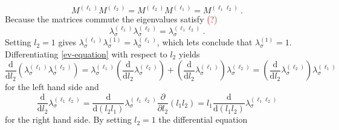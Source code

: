 	\begin{equation}
		M^{(\ell_1)}M^{(\ell_2)} = M^{(\ell_2)}M^{(\ell_1)} =		M^{(\ell_1\ell_2)}~.
	\end{equation}
	Because the matrices commute the eigenvalues satisfy \textcolor{red}{(?)}
	\begin{equation}
		\lambda^{(\ell_1)}_{\sigma} \lambda^{(\ell_2)}_{\sigma} =	\lambda^{(\ell_1\ell_2)}_{\sigma} ~.
		\label{ev-equation}
	\end{equation}
	Setting $l_2 = 1$ gives $\lambda^{(\ell_1)}_{\sigma} \lambda^{(1)}_{\sigma} =	\lambda^{(\ell_1)}_{\sigma}$, which lets conclude that $\lambda^{(1)}_{\sigma} =	1$. Differentiating \autoref{ev-equation} with respect to $l_2$ yields
	\begin{equation}
		\frac{\text{d}}{\text{d}l_2} \left(\lambda^{(\ell_1)}_{\sigma} \lambda^{(\ell_2)}_{\sigma}\right) = \lambda^{(\ell_1)}_{\sigma}  \left(\frac{\text{d}}{\text{d}l_2} \lambda^{(\ell_2)}_{\sigma}\right) +  			  \left( \frac{\text{d}}{\text{d}l_2} \lambda^{(\ell_1)}_{\sigma}\right) \lambda^{(\ell_2)}_{\sigma} 	= \left(\frac{\text{d}}{\text{d}l_2} \lambda^{(\ell_2)}_{\sigma}\right) \lambda^{(\ell_1)}_{\sigma}
	\end{equation}
	for the left hand side and
	\begin{equation}
		\frac{\text{d}}{\text{d}l_2} \lambda^{(\ell_1 \ell_2)}_{\sigma} =	\frac{\text{d}}{\text{d}(l_2 l_1)} \lambda^{(\ell_1 \ell_2)}_{\sigma} \frac{\partial}{\partial l_2} (l_1 l_2) =	l_1 \frac{\text{d}}{\text{d}(l_1l_2)} \lambda^{(\ell_1 \ell_2)}_{\sigma}
	\end{equation}
	for the right hand side. By setting $l_2 =	1$ the differential equation
